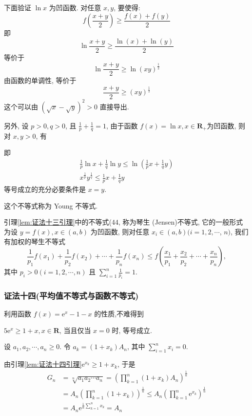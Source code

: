 下面验证 $\ln x$ 为凹函数. 对任意 $x, y$, 要使得:
$$
f\left(\frac{x+y}{2}\right) \geqslant \frac{f(x)+f(y)}{2}
$$
即
$$
\ln \frac{x+y}{2} \geqslant \frac{\ln (x)+\ln (y)}{2}
$$
等价于
$$
\ln \frac{x+y}{2} \geqslant \ln (x y)^{\frac{1}{2}}
$$
由函数的单调性, 等价于
$$
\frac{x+y}{2} \geqslant(x y)^{\frac{1}{2}}
$$
这个可以由 $(\sqrt{x}-\sqrt{y})^{2}>0$ 直接导出.

另外, 设 $p>0, q>0$, 且 $\frac{1}{p}+\frac{1}{q}=1$, 由于函数 $f(x)=\ln x, x \in \mathbf{R}_{+}$为凹函数, 则对 $x, y>0$, 有

即
$$
\begin{gathered}
\frac{1}{p} \ln x+\frac{1}{q} \ln y \leqslant \ln \left(\frac{1}{p} x+\frac{1}{q} y\right) \\
x^{\frac{1}{p}} y^{\frac{1}{q}} \leqslant \frac{1}{p} x+\frac{1}{q} y
\end{gathered}
$$
等号成立的充分必要条件是 $x=y$.

这个不等式称为 Young 不等式.

\begin{note}
引理\ref{lem:证法十三引理}中的不等式(44, 称为琴生 (Jensen)不等式, 它的一般形式为设 $y=f(x), x \in(a, b)$ 为凹函数, 则对任意 $x_{i} \in(a, b)(i=1,2, \cdots$, $n)$, 我们有加权的琴生不等式
$$
\frac{1}{p_{1}} f\left(x_{1}\right)+\frac{1}{p_{2}} f\left(x_{2}\right)+\cdots+\frac{1}{p_{n}} f\left(x_{n}\right) \leqslant f\left(\frac{x_{1}}{p_{1}}+\frac{x_{2}}{p_{2}}+\cdots+\frac{x_{n}}{p_{n}}\right),
$$
其中 $p_{i}>0(i=1,2, \cdots, n)$ 且 $\sum_{i=1}^{n} \frac{1}{p_{i}}=1$.
\end{note}


\subsubsection*{证法十四(平均值不等式与函数不等式)
}
利用函数 $f(x)=\mathrm{e}^{x}-1-x$ 的性质,不难得到

\begin{lemma}\label{lem:证法十四引理}
$5 \mathrm{e}^{x} \geqslant 1+x, x \in \mathbf{R}$, 当且仅当 $x=0$ 时, 等号成立.

设 $a_{1}, a_{2}, \cdots, a_{n} \geqslant 0$. 令 $a_{k}=\left(1+x_{k}\right) A_{n}$, 其中 $\sum_{i=1}^{n} x_{i}=0$.
\end{lemma}

由引理\ref{lem:证法十四引理}$\mathrm{e}^{x_{k}} \geqslant 1+x_{k}$, 于是
$$
\begin{aligned}
G_{n} & =\sqrt[n]{a_{1} a_{2} \cdots a_{n}}=\left(\prod_{k=1}^{n}\left(1+x_{k}\right) A_{n}\right)^{\frac{1}{n}} \\
& =A_{n}\left(\prod_{k=1}^{n}\left(1+x_{k}\right)\right)^{\frac{1}{n}} \leqslant A_{n}\left(\prod_{k=1}^{n} \mathrm{e}^{x_{k}}\right)^{\frac{1}{n}} \\
& =A_{n} \mathrm{e}^{\frac{1}{n} \sum_{k=1}^{n} x_{k}}=A_{n}
\end{aligned}
$$

